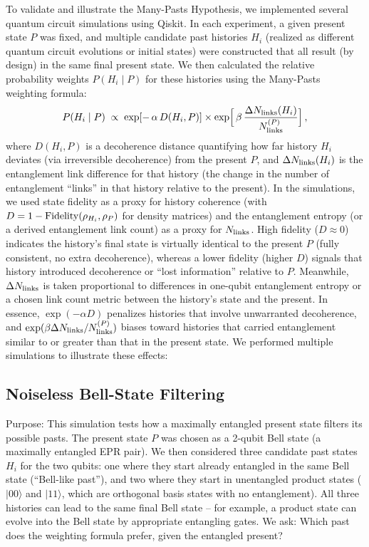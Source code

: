 \documentclass[11pt]{article}
\begin{document}
To validate and illustrate the Many-Pasts Hypothesis, we implemented several quantum circuit simulations using Qiskit. In each experiment, a given present state $P$ was fixed, and multiple candidate past histories ${H_i}$ (realized as different quantum circuit evolutions or initial states) were constructed that all result (by design) in the same final present state. We then calculated the relative probability weights $P(H_i \mid P)$ for these histories using the Many-Pasts weighting formula:
\begin{equation*}
P(H_i \mid P) \;\propto\; \exp[-\,\alpha\,D(H_i, P)] \times \exp\!\Big[\,\beta\,\frac{\Delta N_{\rm links}(H_i)}{N_{\rm links}^{(P)}}\Big]\,,
\end{equation*}
where $D(H_i,P)$ is a decoherence distance quantifying how far history $H_i$ deviates (via irreversible decoherence) from the present $P$, and $\Delta N_{\rm links}(H_i)$ is the entanglement link difference for that history (the change in the number of entanglement “links” in that history relative to the present). In the simulations, we used state fidelity as a proxy for history coherence (with $D = 1 - {\rm Fidelity}(\rho_{H_i}, \rho_P)$ for density matrices) and the entanglement entropy (or a derived entanglement link count) as a proxy for $N_{\rm links}$. High fidelity ($D \approx 0$) indicates the history’s final state is virtually identical to the present $P$ (fully consistent, no extra decoherence), whereas a lower fidelity (higher $D$) signals that history introduced decoherence or “lost information” relative to $P$. Meanwhile, $\Delta N_{\rm links}$ is taken proportional to differences in one-qubit entanglement entropy or a chosen link count metric between the history’s state and the present. In essence, $\exp(-\alpha D)$ penalizes histories that involve unwarranted decoherence, and $\exp(\beta \Delta N_{\rm links}/N_{\rm links}^{(P)})$ biases toward histories that carried entanglement similar to or greater than that in the present state. We performed multiple simulations to illustrate these effects:

\subsection*{Noiseless Bell-State Filtering} %

Purpose: This simulation tests how a maximally entangled present state filters its possible pasts. The present state $P$ was chosen as a 2-qubit Bell state (a maximally entangled EPR pair). We then considered three candidate past states $H_i$ for the two qubits: one where they start already entangled in the same Bell state (“Bell-like past”), and two where they start in unentangled product states ($|00\rangle$ and $|11\rangle$, which are orthogonal basis states with no entanglement). All three histories can lead to the same final Bell state – for example, a product state can evolve into the Bell state by appropriate entangling gates. We ask: Which past does the weighting formula prefer, given the entangled present?
\end{document}

